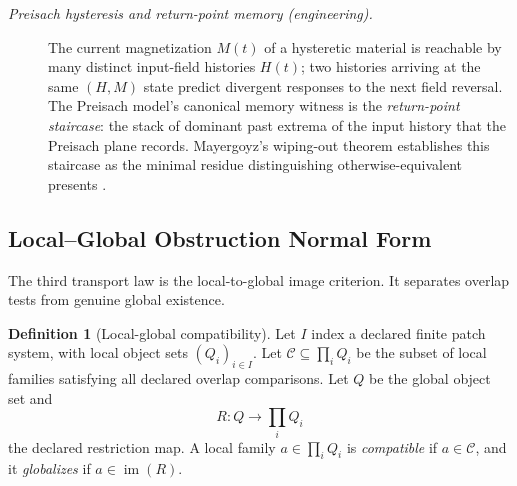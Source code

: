 \documentclass[11pt]{article}
\theoremstyle{definition}
\newtheorem{definition}[theorem]{Definition}
\begin{document}
\begin{description}
\item[\emph{Preisach hysteresis and return-point memory
(engineering).}]
The current magnetization \(M(t)\) of a hysteretic material is
reachable by many distinct input-field histories \(H(t)\); two
histories arriving at the same \((H, M)\) state predict divergent
responses to the next field reversal.  The Preisach model's
canonical memory witness is the \emph{return-point staircase}: the
stack of dominant past extrema of the input history that the
Preisach plane records.  Mayergoyz's wiping-out theorem
establishes this staircase as the minimal residue distinguishing
otherwise-equivalent presents \citep{Mayergoyz2003Hysteresis}.
\end{description}

\subsection{Local--Global Obstruction Normal Form}\label{sec:transport:local-global}

The third transport law is the local-to-global image criterion.  It
separates overlap tests from genuine global existence.

\begin{definition}[Local-global compatibility]\label{def:local-global-compat}
Let \(I\) index a declared finite patch system, with local object sets
\((Q_i)_{i\in I}\).  Let \(\mathcal C\subseteq \prod_i Q_i\) be the
subset of local families satisfying all declared overlap comparisons.
Let \(Q\) be the global object set and
\[
  R:Q\to \prod_i Q_i
\]
the declared restriction map.  A local family \(a\in\prod_i Q_i\) is
\emph{compatible} if \(a\in\mathcal C\), and it \emph{globalizes} if
\(a\in\operatorname{im}(R)\).
\end{definition}
\end{document}
